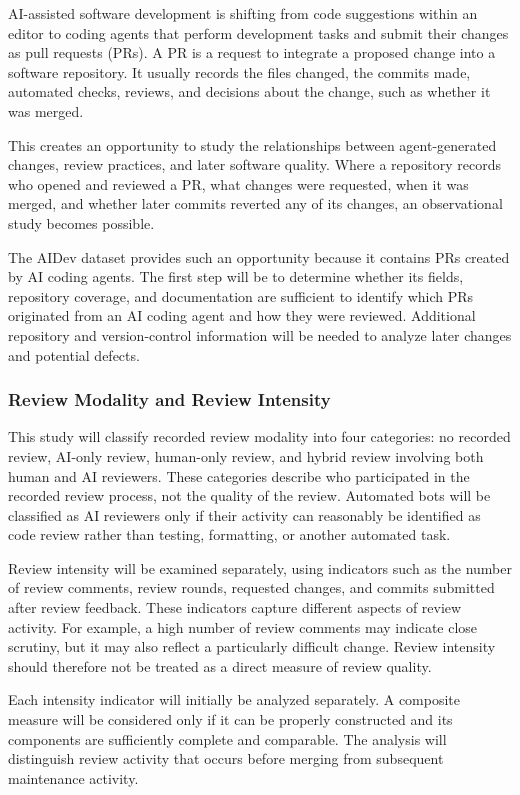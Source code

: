 \documentclass[stu,12pt,donotrepeattitle]{apa7}
\begin{document}
AI-assisted software development is shifting from code suggestions within an editor to coding agents that perform development tasks and submit their changes as pull requests (PRs). A PR is a request to integrate a proposed change into a software repository. It usually records the files changed, the commits made, automated checks, reviews, and decisions about the change, such as whether it was merged.

This creates an opportunity to study the relationships between agent-generated changes, review practices, and later software quality. Where a repository records who opened and reviewed a PR, what changes were requested, when it was merged, and whether later commits reverted any of its changes, an observational study becomes possible.

The AIDev dataset \parencite{li2025} provides such an opportunity because it contains PRs created by AI coding agents. The first step will be to determine whether its fields, repository coverage, and documentation are sufficient to identify which PRs originated from an AI coding agent and how they were reviewed. Additional repository and version-control information will be needed to analyze later changes and potential defects.

\subsubsection{Review Modality and Review Intensity}

This study will classify recorded review modality into four categories: no recorded review, AI-only review, human-only review, and hybrid review involving both human and AI reviewers. These categories describe who participated in the recorded review process, not the quality of the review. Automated bots will be classified as AI reviewers only if their activity can reasonably be identified as code review rather than testing, formatting, or another automated task.

Review intensity will be examined separately, using indicators such as the number of review comments, review rounds, requested changes, and commits submitted after review feedback. These indicators capture different aspects of review activity. For example, a high number of review comments may indicate close scrutiny, but it may also reflect a particularly difficult change. Review intensity should therefore not be treated as a direct measure of review quality.

Each intensity indicator will initially be analyzed separately. A composite measure will be considered only if it can be properly constructed and its components are sufficiently complete and comparable. The analysis will distinguish review activity that occurs before merging from subsequent maintenance activity.
\end{document}
